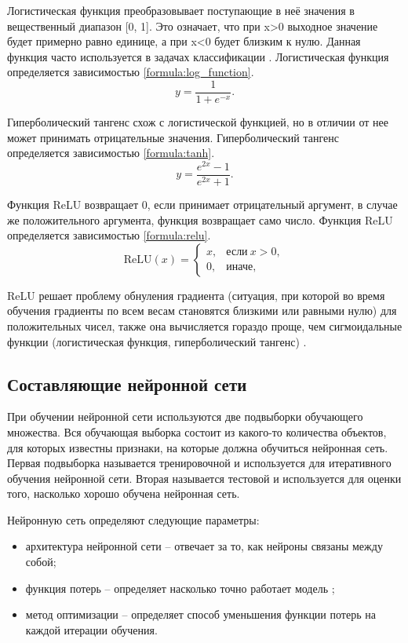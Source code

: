 Логистическая функция преобразовывает поступающие в неё значения в
вещественный диапазон [0, 1]. Это означает, что при x>0 выходное значение будет примерно равно единице, а при x<0 будет близким к нулю. Данная функция часто используется в задачах классификации \cite{activation_function}. Логистическая функция определяется зависимостью \ref{formula:log_function}.
\begin{equation}\label{formula:log_function}
y = \frac{1}{1 + e^{-x}}.
\end{equation}

Гиперболический тангенс схож с логистической функцией, но в отличии от нее может принимать отрицательные значения. Гиперболический тангенс определяется зависимостью \ref{formula:tanh}.
\begin{equation}\label{formula:tanh}
y = \frac{e^{2x} - 1}{e^{2x} + 1}.
\end{equation}

Функция ReLU возвращает 0, если принимает отрицательный аргумент, в случае же положительного аргумента, функция возвращает само число. Функция ReLU определяется зависимостью \ref{formula:relu}.
\begin{equation}\label{formula:relu}
\mathrm{ReLU}(x)=\begin{cases}
x, & \text{если}\ x>0, \\
0, & \text{иначе},
\end{cases}
\end{equation} 

ReLU решает проблему обнуления градиента (ситуация, при которой во время обучения градиенты по всем весам становятся близкими или равными нулю) для положительных чисел, также она вычисляется гораздо проще, чем сигмоидальные функции (логистическая функция, гиперболический тангенс) \cite{activation_function}.

\subsection{Составляющие нейронной сети}
При обучении нейронной сети используются две подвыборки обучающего множества. Вся обучающая выборка состоит из какого-то количества объектов, для которых известны признаки, на которые должна обучиться нейронная сеть. Первая подвыборка называется тренировочной и используется для итеративного обучения нейронной сети. Вторая называется тестовой и используется для оценки того, насколько хорошо обучена нейронная сеть.

Нейронную сеть определяют следующие параметры:
\begin{itemize}
	\item архитектура нейронной сети -- отвечает за то, как нейроны связаны между собой;
	\item функция потерь -- определяет насколько точно работает модель \cite{neuro_base};
	\item метод оптимизации -- определяет способ уменьшения функции потерь на каждой итерации обучения.
\end{itemize}

